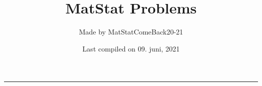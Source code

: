 \documentclass[
]{article}
\title{MatStat Problems}
\author{Made by MatStatComeBack20-21}
\date{Last compiled on 09. juni, 2021}
\begin{document}
\maketitle

\begin{center}\rule{0.5\linewidth}{0.5pt}\end{center}

\newcommand{\C}{\mathbb{C}}

\newcommand{\R}{\mathbb{R}}

\newcommand{\Q}{\mathbb{Q}}

\newcommand{\Z}{\mathbb{Z}}

\newcommand{\N}{\mathbb{N}}

\newcommand{\E}{\mathbb{E}}

\newcommand{\F}{\mathbb{F}}

\newcommand{\B}{\mathbb{B}}

\newcommand{\K}{\mathbb{K}}

\newcommand{\RB}{\overline{\R}}

\newcommand{\ms}[1]{\mathscr{#1}}
\newcommand{\mc}[1]{\mathcal{#1}}
\newcommand{\BR}{\mathcal{B}\left(\R\right)}

\newcommand{\BRB}{\mathcal{B}\left(\RB\right))}

\newcommand{\mf}[1]{\mathfrak{#1}} 
\newcommand{\mcG}[2]{\mathcal{#1}^1(#2)} 
\newcommand{\mcGG}[4]{\mathcal{#1}_{#3}^{#2}(#4)}
\newcommand{\GMR}{\left(X,\ms{A},\mu\right)}

\newcommand{\PBS}{\lrp{\Omega,\F, P}}

\newcommand{\RMR}{\left(\R,\BR, \lambda\right)}

\newcommand{\MRBPBR}{\mc{M}_{\RB}^+\left(\BR\right)}

\newcommand{\MRPBR}{\mc{M}_{\R}^+\left(\BR\right)}

\newcommand{\Lp}[1]{L_{#1}\lrp{\lrs{0,1},m}} 
\newcommand{\mclxy}{\mc{L}\lrp{X,Y}}

\newcommand{\mckxy}{\mc{K}\lrp{X,Y}}

\newcommand{\mssr}{\ms{S}(\R)}

\newcommand{\ra}{\rightarrow}

\newcommand{\nra}{\nrightarrow}

\newcommand{\la}{\leftarrow}

\newcommand{\nla}{\nleftarrow}

\newcommand{\lra}{\leftrightarrow}

\newcommand{\nlra}{\nleftrightarrow}
\end{document}
